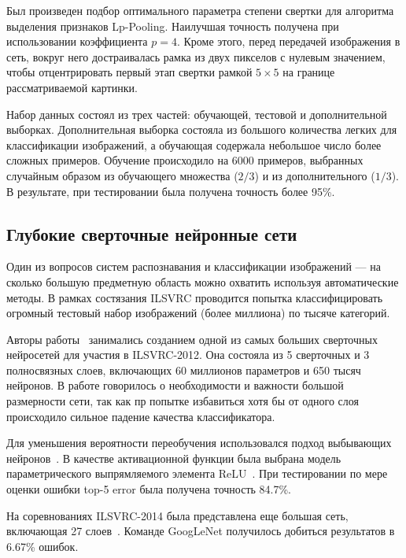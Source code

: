 \documentclass[a4paper,14pt]{extarticle} %
\begin{document}
Был произведен подбор оптимального параметра степени свертки для алгоритма выделения признаков Lp-Pooling. Наилучшая точность получена при использовании коэффициента $p=4$. Кроме этого, перед передачей изображения в сеть, вокруг него достраивалась рамка из двух пикселов с нулевым значением, чтобы отцентрировать первый этап свертки рамкой $5 \times 5$ на границе рассматриваемой картинки.

Набор данных состоял из трех частей: обучающей, тестовой и дополнительной выборках. Дополнительная выборка состояла из большого количества легких для классификации изображений, а обучающая содержала небольшое число более сложных примеров. Обучение происходило на 6000 примеров, выбранных случайным образом из обучающего множества ($2/3$) и из дополнительного ($1/3$). В результате, при тестировании была получена точность более 95\%.

\subsection{Глубокие сверточные нейронные сети}
\hspace{\parindent} Один из вопросов систем распознавания и классификации изображений --- на сколько большую предметную область можно охватить используя автоматические методы. В рамках состязания ILSVRC проводится попытка классифицировать огромный тестовый набор изображений (более миллиона) по тысяче категорий.

Авторы работы~\cite{krizhevsky2012imagenet} занимались созданием одной из самых больших сверточных нейросетей для участия в ILSVRC-2012. Она состояла из 5 сверточных и 3 полносвязных слоев, включающих 60 миллионов параметров и 650 тысяч нейронов. В работе говорилось о необходимости и важности большой размерности сети, так как пр попытке избавиться хотя бы от одного слоя происходило сильное падение качества классификатора. 

Для уменьшения вероятности переобучения использовался подход выбывающих нейронов~\cite{srivastava2014dropout}. В качестве активационной функции была выбрана модель параметрического выпрямляемого элемента ReLU~\cite{dahl2013improving}. При тестировании по мере оценки ошибки top-5 error была получена точность 84.7\%.

На соревнованиях ILSVRC-2014 была представлена еще большая сеть, включающая 27 слоев~\cite{szegedy2014going}. Команде GoogLeNet получилось добиться результатов в 6.67\% ошибок.
\end{document}
